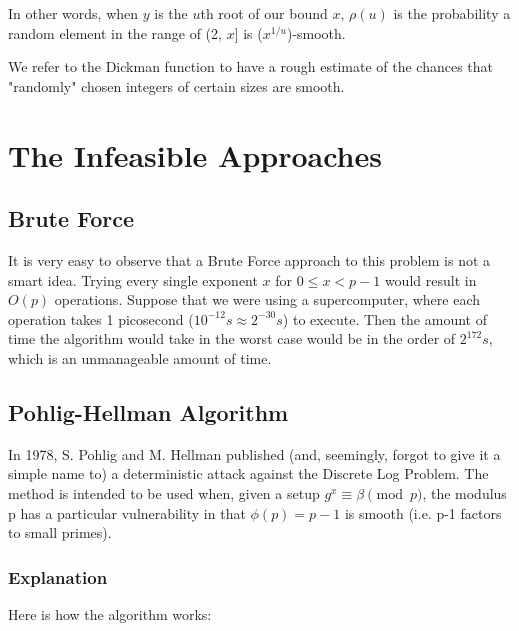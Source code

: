 \documentclass{article}
\begin{document}
      In other words, when $y$ is the $u$th root of our bound $x$, $\rho(u)$ is the probability a random element in the range of (2, $x$] is ($x^{1/u}$)-smooth.

      We refer to the Dickman function to have a rough estimate of the chances that "randomly" chosen integers of certain sizes are smooth.

      \section{The Infeasible Approaches}

      \subsection{Brute Force}

      It is very easy to observe that a Brute Force approach to this problem is not a smart idea. Trying every single exponent $x$ for $0 \leq x < p-1$ would result in $O(p)$ operations. Suppose that we were using a supercomputer, where each operation takes 1 picosecond ($10^{-12}s \approx 2^{-30}s$) to execute. Then the amount of time the algorithm would take in the worst case would be in the order of $2^{172}s$, which is an unmanageable amount of time.

      \subsection{Pohlig-Hellman Algorithm}

      In 1978, S. Pohlig and M. Hellman published (and, seemingly, forgot to give it a simple name to) a deterministic attack against the Discrete Log Problem. The method is intended to be used when, given a setup $g^x \equiv \beta \pmod{p}$, the modulus p has a particular vulnerability in that $\phi(p) = p-1$ is smooth (i.e. p-1 factors to small primes).

      \subsubsection{Explanation}

      Here is how the algorithm works:
\end{document}
